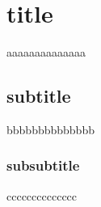 \section{title}
aaaaaaaaaaaaaa

\subsection{subtitle}
bbbbbbbbbbbbbb

\subsubsection{subsubtitle}
cccccccccccccc
